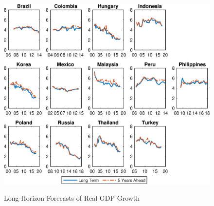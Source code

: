 \documentclass{article}
\begin{document}
\begin{figure}[tbph]
	\begin{center}
		\caption{Long-Horizon Forecasts of Real GDP Growth}
		\label{fig:wnGDP}
		\includegraphics[trim={0cm 0cm 0cm 0cm},clip,height=1\textheight,width=1.4\textwidth]{../Figures/Surveys/wnGDP.eps} \\
	\end{center}
\end{figure}
\end{document}
